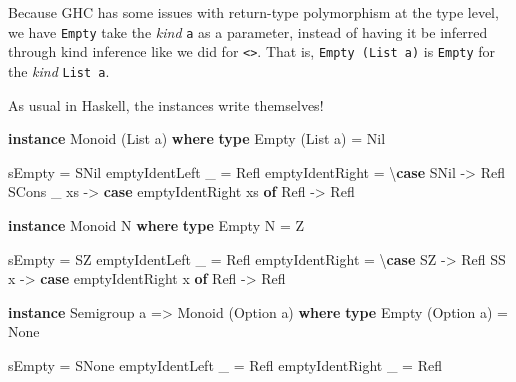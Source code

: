 \documentclass[]{article}
\newenvironment{Shaded}{}{}
\newcommand{\KeywordTok}[1]{\textcolor[rgb]{0.00,0.44,0.13}{\textbf{{#1}}}}
\newcommand{\DataTypeTok}[1]{\textcolor[rgb]{0.56,0.13,0.00}{{#1}}}
\newcommand{\OtherTok}[1]{\textcolor[rgb]{0.00,0.44,0.13}{{#1}}}
\newcommand{\FunctionTok}[1]{\textcolor[rgb]{0.02,0.16,0.49}{{#1}}}
\newcommand{\NormalTok}[1]{{#1}}
\begin{document}
Because GHC has some issues with return-type polymorphism at the type level, we
have \texttt{Empty} take the \emph{kind} \texttt{a} as a parameter, instead of
having it be inferred through kind inference like we did for
\texttt{\textless{}\textgreater{}}. That is, \texttt{Empty\ (List\ a)} is
\texttt{Empty} for the \emph{kind} \texttt{List\ a}.

As usual in Haskell, the instances write themselves!

\begin{Shaded}
\begin{Highlighting}[]
\KeywordTok{instance} \DataTypeTok{Monoid} \NormalTok{(}\DataTypeTok{List} \NormalTok{a) }\KeywordTok{where}
    \KeywordTok{type} \DataTypeTok{Empty} \NormalTok{(}\DataTypeTok{List} \NormalTok{a) }\FunctionTok{=} \DataTypeTok{Nil}

    \NormalTok{sEmpty }\FunctionTok{=} \DataTypeTok{SNil}
    \NormalTok{emptyIdentLeft _ }\FunctionTok{=} \DataTypeTok{Refl}
    \NormalTok{emptyIdentRight  }\FunctionTok{=} \NormalTok{\textbackslash{}}\KeywordTok{case}
      \DataTypeTok{SNil} \OtherTok{->} \DataTypeTok{Refl}
      \DataTypeTok{SCons} \NormalTok{_ xs }\OtherTok{->}
        \KeywordTok{case} \NormalTok{emptyIdentRight xs }\KeywordTok{of}
          \DataTypeTok{Refl} \OtherTok{->} \DataTypeTok{Refl}

\KeywordTok{instance} \DataTypeTok{Monoid} \DataTypeTok{N} \KeywordTok{where}
    \KeywordTok{type} \DataTypeTok{Empty} \DataTypeTok{N} \FunctionTok{=} \DataTypeTok{Z}

    \NormalTok{sEmpty }\FunctionTok{=} \DataTypeTok{SZ}
    \NormalTok{emptyIdentLeft _ }\FunctionTok{=} \DataTypeTok{Refl}
    \NormalTok{emptyIdentRight  }\FunctionTok{=} \NormalTok{\textbackslash{}}\KeywordTok{case}
      \DataTypeTok{SZ} \OtherTok{->} \DataTypeTok{Refl}
      \DataTypeTok{SS} \NormalTok{x }\OtherTok{->} \KeywordTok{case} \NormalTok{emptyIdentRight x }\KeywordTok{of}
        \DataTypeTok{Refl} \OtherTok{->} \DataTypeTok{Refl}

\KeywordTok{instance} \DataTypeTok{Semigroup} \NormalTok{a }\OtherTok{=>} \DataTypeTok{Monoid} \NormalTok{(}\DataTypeTok{Option} \NormalTok{a) }\KeywordTok{where}
    \KeywordTok{type} \DataTypeTok{Empty} \NormalTok{(}\DataTypeTok{Option} \NormalTok{a) }\FunctionTok{=} \DataTypeTok{None}

    \NormalTok{sEmpty }\FunctionTok{=} \DataTypeTok{SNone}
    \NormalTok{emptyIdentLeft  _ }\FunctionTok{=} \DataTypeTok{Refl}
    \NormalTok{emptyIdentRight _ }\FunctionTok{=} \DataTypeTok{Refl}
\end{Highlighting}
\end{Shaded}
\end{document}
